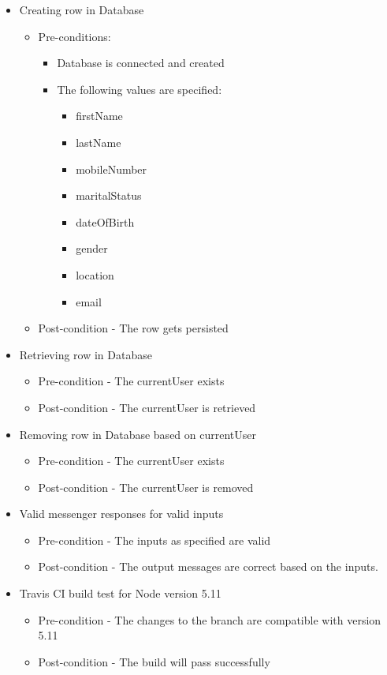 \documentclass{article}
\begin{document}
\begin{itemize}
\item Creating row in Database
\begin{itemize}
	\item Pre-conditions:
		\begin{itemize}
		\item Database is connected and created
		\item The following values are specified:  
		\begin{itemize}
		\item firstName
  		\item lastName
  		\item mobileNumber 
  		\item maritalStatus 
  		\item dateOfBirth 
 		\item gender
  		\item location 
 		\item email
 		\end{itemize} 
		\end{itemize}
\item Post-condition - The row gets persisted
\end{itemize}
\item Retrieving row in Database
	\begin{itemize}
	\item Pre-condition - The currentUser exists
	\item Post-condition - The currentUser is retrieved 
	\end{itemize}

\item Removing row in Database based on currentUser 
	\begin{itemize}
	\item Pre-condition - The currentUser exists
	\item Post-condition - The currentUser is removed
	\end{itemize}

\item Valid messenger responses for valid inputs
	\begin{itemize}
	\item Pre-condition - The inputs as specified are valid
	\item Post-condition - The output messages are correct based on the inputs.
	\end{itemize}

\item Travis CI build test for Node version 5.11
	\begin{itemize}
	\item Pre-condition - The changes to the branch are compatible with version 5.11
	\item Post-condition - The build will pass successfully 
	\end{itemize}	
	

\end{itemize}
\end{document}

